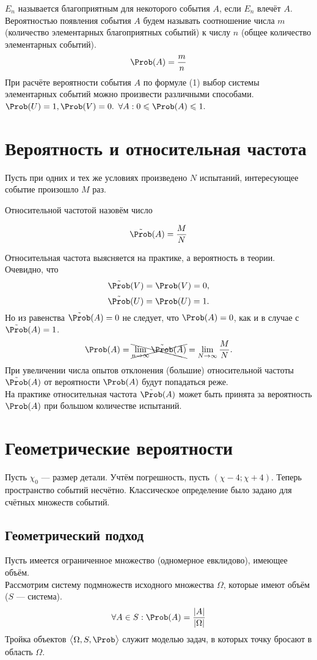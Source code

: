  $E_n$ называется благоприятным для некоторого события $A$, если $E_n$ влечёт $A$.
 Вероятностью появления события $A$ будем называть соотношение числа $m$ (количество элементарных благоприятных событий) к числу $n$ (общее количество элементарных событий).
\begin{equation}
  \Prob (A) = \frac{m}{n} \hfill
\end{equation}
\addition При расчёте вероятности события $A$ по формуле (1) выбор системы элементарных событий можно произвести различными способами.
\conclusion $\Prob(U) = 1, \Prob(V) = 0.$
\conclusion $\forall A: 0 \leqslant \Prob(A) \leqslant 1.$
\section{Вероятность и относительная частота}
\begin{definition}
  Пусть при одних и тех же условиях произведено $N$ испытаний, интересующее событие произошло $M$ раз.
\end{definition}

Относительной частотой назовём число

\begin{equation}
  \tilde{\Prob}(A) = \frac{M}{N}
\end{equation}

 Относительная частота выясняется на практике, а вероятность в теории.
Очевидно, что
$$\tilde{\Prob}(V) = \Prob(V) = 0,$$
$$\tilde{\Prob}(U) = \Prob(U) = 1.$$
Но из равенства $\tilde{\Prob}(A) = 0$ не следует, что $\Prob(A) = 0$, как и в случае с  $\tilde{\Prob}(A) = 1$.
\[
  \Prob(A) = \xcancel {\lim_{n\to\infty} \tilde{\Prob}(A)} = \lim_{N\to\infty} \frac{M}{N}.
\]
При увеличении числа опытов отклонения (большие) относительной частоты $\tilde{\Prob}(A)$ от вероятности $\Prob(A)$ будут попадаться реже. \\
На практике относительная частота $\tilde{\Prob}(A)$ может быть принята за вероятность $\Prob(A)$ при большом количестве испытаний.

\section{Геометрические вероятности}
Пусть $\chi_0$ --- размер детали. Учтём погрешность, пусть $(\chi - 4; \chi + 4)$. Теперь пространство событий несчётно. Классическое определение было задано для счётных множеств событий.

\subsection{Геометрический подход}
Пусть имеется ограниченное множество (одномерное евклидово), имеющее объём. \\
Рассмотрим систему подмножеств исходного множества $\Omega$, которые имеют объём ($S$ --- система).
\[
  \forall A \in S:  \Prob(A) = \frac{|A|}{|\Omega|}
\]
Тройка объектов $ \big<\Omega, S, \Prob\big> $ служит моделью задач, в которых точку бросают в область $\Omega$.
\smallskip

